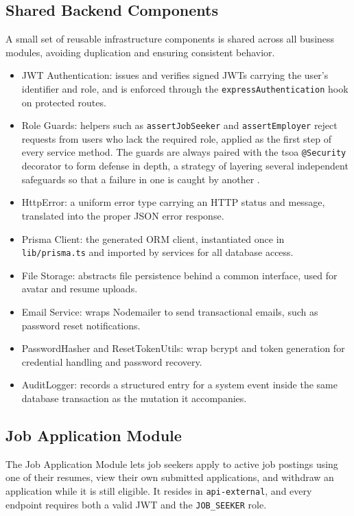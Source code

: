 \subsection{Shared Backend Components}
\label{c4:subsection:shared-backend-components}
A small set of reusable infrastructure components is shared across all business modules, avoiding duplication and ensuring consistent behavior.

\begin{itemize}
	\item JWT Authentication: issues and verifies signed JWTs \cite{rfc7519} carrying the user's identifier and role, and is enforced through the \texttt{expressAuthentication} hook on protected routes.
	\item Role Guards: helpers such as \texttt{assertJobSeeker} and \texttt{assertEmployer} reject requests from users who lack the required role, applied as the first step of every service method. The guards are always paired with the tsoa \texttt{@Security} decorator to form defense in depth, a strategy of layering several independent safeguards so that a failure in one is caught by another \cite{nist2020sp80053}.
	\item HttpError: a uniform error type carrying an HTTP status and message, translated into the proper JSON error response.
	\item Prisma Client: the generated ORM client, instantiated once in \texttt{lib/prisma.ts} and imported by services for all database access.
	\item File Storage: abstracts file persistence behind a common interface, used for avatar and resume uploads.
	\item Email Service: wraps Nodemailer \cite{nodemailer_docs} to send transactional emails, such as password reset notifications.
	\item PasswordHasher and ResetTokenUtils: wrap bcrypt \cite{provos1999bcrypt} and token generation for credential handling and password recovery.
	\item AuditLogger: records a structured entry for a system event inside the same database transaction as the mutation it accompanies.
\end{itemize}

\subsection{Job Application Module}
\label{c4:subsection:job-application-module}
The Job Application Module lets job seekers apply to active job postings using one of their resumes, view their own submitted applications, and withdraw an application while it is still eligible. It resides in \texttt{api-external}, and every endpoint requires both a valid JWT and the \texttt{JOB\_SEEKER} role.

